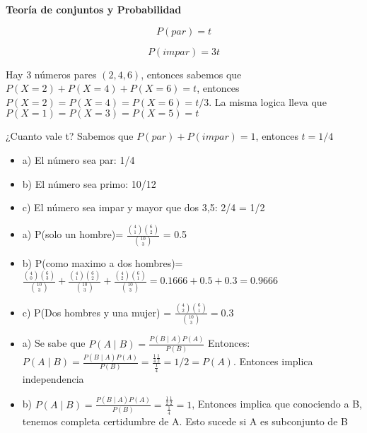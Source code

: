 \documentclass{../oxmathproblems}
\begin{document}
\begin{questions}

\miquestion \textbf{Teoría de conjuntos y Probabilidad}


$$ P(par) = t $$

$$ P(impar) = 3t $$

Hay 3 números pares $(2,4,6)$, entonces sabemos que $P(X = 2)+ P(X = 4) + P(X = 6) = t$, entonces $P(X = 2) = P(X = 4) = P(X = 6) = t/3$. La misma logica lleva que $P(X = 1) = P(X = 3) = P(X = 5) = t$

¿Cuanto vale t? Sabemos que $P(par)+P(impar) = 1$, entonces $t = 1/4$

\begin{itemize}

\item a) El número sea par: 1/4
\item b) El número sea primo:
 10/12  
\item c) El número sea impar y mayor que dos {3,5}: 2/4 = 1/2

\end{itemize}

\miquestion
\begin{itemize}

\item a) P(solo un hombre)= $\frac{\binom{4}{1}\binom{6}{2}}{\binom{10}{3}}$ = 0.5
\item b) P(como maximo a dos hombres)= $\frac{\binom{4}{0}\binom{6}{3}}{\binom{10}{3}}+ \frac{\binom{4}{1}\binom{6}{2}}{\binom{10}{3}} + \frac{\binom{4}{2}\binom{6}{1}}{\binom{10}{3}} = 0.1666 + 0.5 + 0.3 = 0.9666$
\item c) P(Dos hombres y una mujer) = $\frac{\binom{4}{2}\binom{6}{1}}{\binom{10}{3}}  = 0.3$
\end{itemize}

\miquestion

\begin{itemize}


\item a) Se sabe que $P(A \mid B) = \frac{P(B \mid A) P (A) }{P(B)}$ Entonces: 
$P(A \mid B) =  \frac{P(B \mid A) P (A) }{P(B)} = \frac{\frac{1}{4} \frac{1}{2} }{\frac{1}{4}} = 1/2 = P(A)$. Entonces implica independencia

\item b) $P(A \mid B) = \frac{P(B \mid A) P (A) }{P(B)} = \frac{\frac{1}{2} \frac{1}{2} }{\frac{1}{4}} = 1$, Entonces implica que conociendo a B, tenemos completa certidumbre de A. Esto sucede si A es subconjunto de B


\end{itemize}
\end{questions}
\end{document}
